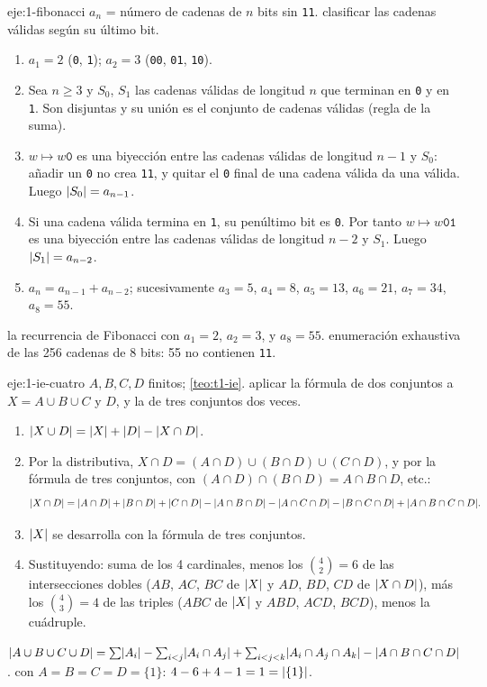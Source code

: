 \begin{solucion}{eje:1-fibonacci}
\datos $a_n$ = número de cadenas de $n$ bits sin \texttt{11}.
\planteamiento clasificar las cadenas válidas según su último bit.
\pasos
\begin{enumerate}[label=\arabic*.]
  \item $a_1=2$ (\texttt{0}, \texttt{1}); $a_2=3$ (\texttt{00}, \texttt{01}, \texttt{10}).
  \item Sea $n\ge3$ y $S_0$, $S_1$ las cadenas válidas de longitud $n$ que terminan en \texttt{0} y en \texttt{1}. Son disjuntas y su unión es el conjunto de cadenas válidas (regla de la suma).
  \item $w\mapsto w\texttt{0}$ es una biyección entre las cadenas válidas de longitud $n-1$ y $S_0$: añadir un \texttt{0} no crea \texttt{11}, y quitar el \texttt{0} final de una cadena válida da una válida. Luego $\lvert S_0\rvert=a_{n-1}$.
  \item Si una cadena válida termina en \texttt{1}, su penúltimo bit es \texttt{0}. Por tanto $w\mapsto w\texttt{01}$ es una biyección entre las cadenas válidas de longitud $n-2$ y $S_1$. Luego $\lvert S_1\rvert=a_{n-2}$.
  \item $a_n=a_{n-1}+a_{n-2}$; sucesivamente $a_3=5$, $a_4=8$, $a_5=13$, $a_6=21$, $a_7=34$, $a_8=55$.
\end{enumerate}
\resultado la recurrencia de Fibonacci con $a_1=2$, $a_2=3$, y $a_8=55$.
\comprobacion enumeración exhaustiva de las 256 cadenas de 8 bits: 55 no contienen \texttt{11}.
\end{solucion}

\begin{solucion}{eje:1-ie-cuatro}
\datos $A,B,C,D$ finitos; \cref{teo:t1-ie}.
\planteamiento aplicar la fórmula de dos conjuntos a $X=A\cup B\cup C$ y $D$, y la de tres conjuntos dos veces.
\pasos
\begin{enumerate}[label=\arabic*.]
  \item $\lvert X\cup D\rvert=\lvert X\rvert+\lvert D\rvert-\lvert X\cap D\rvert$.
  \item Por la distributiva, $X\cap D=(A\cap D)\cup(B\cap D)\cup(C\cap D)$, y por la fórmula de tres conjuntos, con $(A\cap D)\cap(B\cap D)=A\cap B\cap D$, etc.:
  \[
  \lvert X\cap D\rvert=\lvert A\cap D\rvert+\lvert B\cap D\rvert+\lvert C\cap D\rvert-\lvert A\cap B\cap D\rvert-\lvert A\cap C\cap D\rvert-\lvert B\cap C\cap D\rvert+\lvert A\cap B\cap C\cap D\rvert.
  \]
  \item $\lvert X\rvert$ se desarrolla con la fórmula de tres conjuntos.
  \item Sustituyendo: suma de los 4 cardinales, menos los $\binom42=6$ de las intersecciones dobles ($AB$, $AC$, $BC$ de $\lvert X\rvert$ y $AD$, $BD$, $CD$ de $\lvert X\cap D\rvert$), más los $\binom43=4$ de las triples ($ABC$ de $\lvert X\rvert$ y $ABD$, $ACD$, $BCD$), menos la cuádruple.
\end{enumerate}
\resultado $\lvert A\cup B\cup C\cup D\rvert=\sum\lvert A_i\rvert-\sum_{i<j}\lvert A_i\cap A_j\rvert+\sum_{i<j<k}\lvert A_i\cap A_j\cap A_k\rvert-\lvert A\cap B\cap C\cap D\rvert$.
\comprobacion con $A=B=C=D=\{1\}$: $4-6+4-1=1=\lvert\{1\}\rvert$.
\end{solucion}

